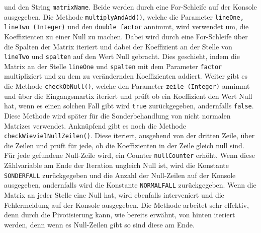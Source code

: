 \documentclass[a4paper, 12pt]{report}
\begin{document}
und den String \texttt{matrixName}. Beide werden durch eine For-Schleife auf der Konsole ausgegeben.
Die Methode \texttt{multiplyAndAdd()}, welche die Parameter \texttt{lineOne, lineTwo (Integer)}
und den \texttt{double factor} annimmt, wird verwendet um, die Koeffizienten zu einer Null zu machen.
Dabei wird durch eine For-Schleife über die Spalten der Matrix iteriert
und dabei der Koeffizient an der Stelle von \texttt{lineTwo} und \texttt{spalten} auf den Wert Null gebracht.
Dies geschieht, indem die Matrix an der Stelle \texttt{lineOne} und \texttt{spalten} mit dem Parameter \texttt{factor} multipliziert
und zu dem zu verändernden Koeffizienten addiert.
Weiter gibt es die Methode \texttt{checkObNull()}, welche den Parameter \texttt{zeile (Integer)} annimmt
und über die Eingangsmartix iteriert und prüft ob ein Koeffizient den Wert Null hat, wenn es einen solchen Fall gibt
wird \texttt{true} zurückgegeben, andernfalls \texttt{false}.
Diese Methode wird später für die Sonderbehandlung von nicht normalen Matrizes verwendet.
Anknüpfend gibt es noch die Methode \texttt{checkWievielNullZeilen()}. Diese iteriert, ausgehend von der dritten Zeile,
über die Zeilen und prüft für jede, ob die Koeffizienten in der Zeile gleich null sind. Für jede gefundene Null-Zeile wird, ein Counter
\texttt{nullCounter} erhöht. Wenn diese Zählvariable am Ende der Iteration ungleich Null ist, wird die Konstante \texttt{SONDERFALL} zurückgegeben
und die Anzahl der Null-Zeilen auf der Konsole ausgegeben, andernfalls wird die Konstante \texttt{NORMALFALL} zurückgegeben.
Wenn die Matrix an jeder Stelle eine Null hat, wird ebenfalls interveniert und die Fehlermeldung auf der Konsole ausgegeben.
Die Methode arbeitet sehr effektiv, denn durch die Pivotisierung kann, wie bereits erwähnt, von hinten iteriert werden, denn
wenn es Null-Zeilen gibt so sind diese am Ende.
\end{document}
